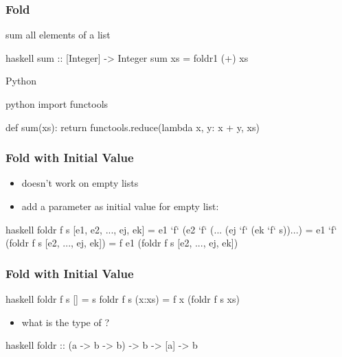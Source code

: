 \documentclass[dvipsnames]{beamer}
\theoremstyle{plain}
\begin{document}
\begin{frame}[fragile]
  \frametitle{Fold}

  \begin{exampleblock}{sum all elements of a list}
    \begin{pygments}{haskell}
sum :: [Integer] -> Integer
sum xs = foldr1 (+) xs
    \end{pygments}
  \end{exampleblock}

  \bigskip
  \begin{exampleblock}{Python}
    \begin{pygments}{python}
import functools

def sum(xs):
  return functools.reduce(lambda x, y: x + y, xs)
    \end{pygments}
  \end{exampleblock}
\end{frame}

\begin{frame}[fragile]
  \frametitle{Fold with Initial Value}

  \begin{itemize}
    \item {} doesn't work on empty lists
    \item add a parameter as initial value for empty list:
  \end{itemize}

  \begin{block}{}
    \begin{pygments}{haskell}
foldr f s [e1, e2, ..., ej, ek]
    = e1 `f` (e2 `f` (... (ej `f` (ek `f` s))...)
    = e1 `f` (foldr f s [e2, ..., ej, ek])
    = f e1 (foldr f s [e2, ..., ej, ek])
    \end{pygments}
  \end{block}
\end{frame}

\begin{frame}[fragile]
  \frametitle{Fold with Initial Value}

  \begin{exampleblock}{}
    \begin{pygments}{haskell}
foldr f s []     = s
foldr f s (x:xs) = f x (foldr f s xs)
    \end{pygments}

    \pause
    \begin{itemize}
      \item what is the type of ?
    \end{itemize}

    \begin{pygments}{haskell}
foldr :: (a -> b -> b) -> b -> [a] -> b
    \end{pygments}
  \end{exampleblock}
\end{frame}
\end{document}
